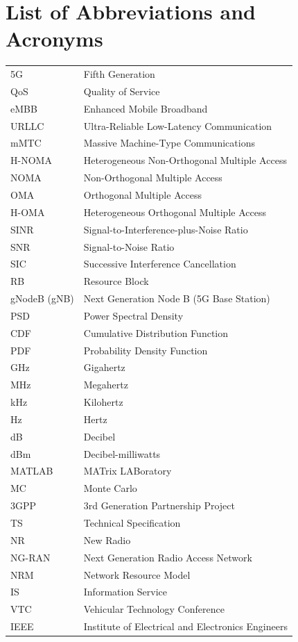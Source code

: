 \documentclass[
]{article}
\begin{document}
\section*{List of Abbreviations and Acronyms}
\begin{tabular}{p{} p{}}
5G & Fifth Generation \\
QoS & Quality of Service \\
eMBB & Enhanced Mobile Broadband \\
URLLC & Ultra-Reliable Low-Latency Communication \\
mMTC & Massive Machine-Type Communications \\
H-NOMA & Heterogeneous Non-Orthogonal Multiple Access \\
NOMA & Non-Orthogonal Multiple Access \\
OMA & Orthogonal Multiple Access \\
H-OMA & Heterogeneous Orthogonal Multiple Access \\
SINR & Signal-to-Interference-plus-Noise Ratio \\
SNR & Signal-to-Noise Ratio \\
SIC & Successive Interference Cancellation \\
RB & Resource Block \\
gNodeB (gNB) & Next Generation Node B (5G Base Station) \\
PSD & Power Spectral Density \\
CDF & Cumulative Distribution Function \\
PDF & Probability Density Function \\
GHz & Gigahertz \\
MHz & Megahertz \\
kHz & Kilohertz \\
Hz & Hertz \\
dB & Decibel \\
dBm & Decibel-milliwatts \\
MATLAB & MATrix LABoratory \\
MC & Monte Carlo \\
3GPP & 3rd Generation Partnership Project \\
TS & Technical Specification \\
NR & New Radio \\
NG-RAN & Next Generation Radio Access Network \\
NRM & Network Resource Model \\
IS & Information Service \\
VTC & Vehicular Technology Conference \\
IEEE & Institute of Electrical and Electronics Engineers \\
\end{tabular}
\clearpage
\end{document}
